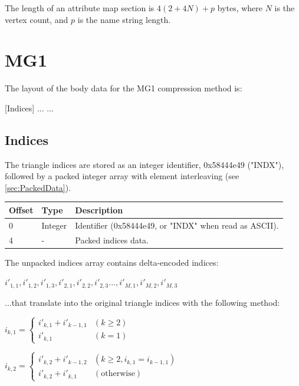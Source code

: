 The length of an attribute map section is $4(2+4N)+p$ bytes, where $N$ is the vertex
count, and $p$ is the name string length.


\section{MG1}
The layout of the body data for the MG1 compression method is:

[Indices]\newline
[Vertices]\newline
[Normals]\newline
[UV map 0]\newline
[UV map 1]\newline
...\newline
[UV map N]\newline
...

\subsection{Indices}
\label{sec:MG1Indices}
The triangle indices are stored as an integer identifier, 0x58444e49 ("INDX"),
followed by a packed integer array with element interleaving (see
\ref{sec:PackedData}).

\begin{tabular}{|l|l|l|}\hline
\textbf{Offset} &  \textbf{Type} & \textbf{Description}\\ \hline
0 & Integer & Identifier (0x58444e49, or "INDX" when read as ASCII).\\ \hline
4 & - & Packed indices data.\\ \hline
\end{tabular}

The unpacked indices array contains delta-encoded indices:

$i'_{1,1}, i'_{1,2}, i'_{1,3}, i'_{2,1}, i'_{2,2}, i'_{2,3} ..., i'_{M,1}, i'_{M,2}, i'_{M,3}$

...that translate into the original triangle indices with the following method:

$i_{k,1} = \begin{cases}
i'_{k,1} + i'_{k-1,1}  & (k \geq 2) \\
i'_{k,1} & (k = 1)
\end{cases}$

$i_{k,2} = \begin{cases}
i'_{k,2} + i'_{k-1,2}  & (k \geq 2, i_{k,1} = i_{k-1,1}) \\
i'_{k,2} + i'_{k,1} &  (\text{otherwise})
\end{cases}$

